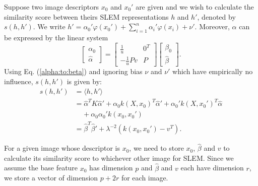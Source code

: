 Suppose two image descriptors $x_0$ and $x_0'$ are given and we wish to calculate the similarity score between theirs SLEM representations $h$ and $h'$, denoted by $s(h,h')$. 
We write $h'=\alpha_0'\varphi(x_0')+\sum_{i=1}^n \alpha_i'\varphi (x_i)+\nu'$. 
Moreover, $\alpha$ can be expressed by the linear system
\begin{equation}
\begin{bmatrix} \alpha_0 \\ \hat{\alpha} \end{bmatrix} = \begin{bmatrix} \frac{1}{u} & 0^T \\-\frac{1}{u}Pv & P  \end{bmatrix} \begin{bmatrix}\beta_0 \\ \hat{\beta} \end{bmatrix}.\label{alpha:to:beta}
\end{equation}
Using Eq. (\ref{alpha:to:beta}) and ignoring bias $\nu$ and $\nu'$ which have empirically no influence, $s(h,h')$ is given by:
\begin{equation}
\begin{split}
s(h,h') & = \langle h, h'\rangle \\
		& = \hat{\alpha}^{T} K\hat{\alpha}'+\alpha_0k(X, x_0)^T\hat{\alpha}'+\alpha_0'k(X, x_0')^T\hat{\alpha} \\
		& \ \ \ \ \ +\alpha_0\alpha_0'k(x_0,x_0')\\
		& = \hat{\beta}^T\hat{\beta}'+\lambda^{-2}(k(x_0,x_0')-v^T).
\end{split}
\end{equation}

For a given image whose descriptor is $x_0$, we need to store $x_0$, $\hat{\beta}$ and $v$ to calculate its similarity score to whichever other image for SLEM. Since we assume the base feature $x_0$ has dimension $p$ and $\hat{\beta}$ and $v$ each have dimension $r$, we store a vector of dimension $p+2r$ for each image.

